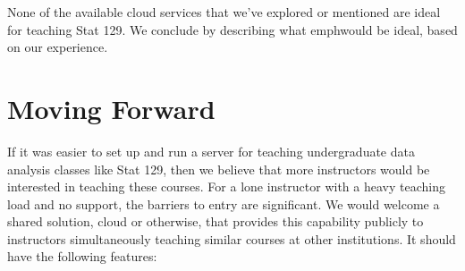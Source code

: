 \documentclass[12pt]{article}
\begin{document}
None of the available cloud services that we've explored or mentioned are ideal for teaching Stat 129.
We conclude by describing what emph{would} be ideal, based on our experience.

\section{Moving Forward}

If it was easier to set up and run a server for teaching undergraduate data analysis classes like Stat 129, then we believe that more instructors would be interested in teaching these courses.
For a lone instructor with a heavy teaching load and no support, the barriers to entry are significant.
We would welcome a shared solution, cloud or otherwise, that provides this capability publicly to instructors simultaneously teaching similar courses at other institutions.
It should have the following features:
\end{document}
